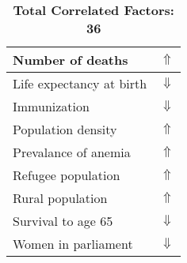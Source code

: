 \documentclass[12pt,notitlepage,oneside]{report}
\begin{document}
\begin{table}[!htb]
\begin{tabular}{|l|l|}
Number of deaths & $\Uparrow$\\ \hline
Life expectancy at birth & $\Downarrow$\\ \hline
Immunization & $\Downarrow$\\ \hline
Population density & $\Uparrow$\\ \hline
Prevalance of anemia & $\Uparrow$\\ \hline
Refugee population & $\Uparrow$\\ \hline
Rural population & $\Uparrow$\\ \hline
Survival to age 65 & $\Downarrow$\\ \hline
Women in parliament & $\Downarrow$\\ \hline
\end{tabular}
\caption*{\textbf{Total Correlated Factors: 36}}
\end{table}
\clearpage
\end{document}
